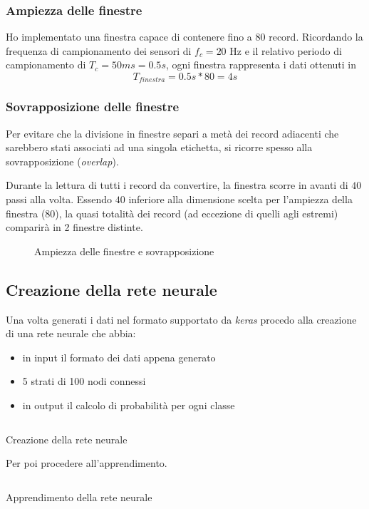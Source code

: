 \subsubsection{Ampiezza delle finestre}
Ho implementato una finestra capace di contenere fino a $80$ record. Ricordando la frequenza di 
campionamento dei sensori di $f_c = 20$ Hz e il relativo periodo di campionamento di $T_c = 50ms = 0.5s$, ogni finestra rappresenta i dati ottenuti in 
$$T_{finestra} = 0.5s * 80 = 4s$$

\subsubsection{Sovrapposizione delle finestre}
Per evitare che la divisione in finestre separi a metà dei record adiacenti che sarebbero stati associati 
ad una singola etichetta, si ricorre spesso alla sovrapposizione (\textit{overlap}).

Durante la lettura di tutti i record da convertire, la finestra scorre in avanti 
di $40$ passi alla volta. Essendo $40$ inferiore alla dimensione scelta per l'ampiezza della finestra ($80$), 
la quasi totalità dei record (ad eccezione di quelli agli estremi) comparirà in 2 finestre distinte.

\vfill
\begin{figure}[H]
    \centering
    
    \caption{Ampiezza delle finestre e sovrapposizione}
    \label{fig:overlay}
\end{figure}


\newpage
\subsection{Creazione della rete neurale}
Una volta generati i dati nel formato supportato da \textit{keras} procedo alla creazione di 
una rete neurale che abbia:
\begin{itemize}
    \item in input il formato dei dati appena generato
    \item 5 strati di 100 nodi connessi
    \item in output il calcolo di probabilità per ogni classe
\end{itemize}
\begin{listing}[H] 
    \inputminted[frame=single,framesep=10pt]{python}{assets/snippets/classifier/dnn_create.py}
    \caption{Creazione della rete neurale}
\end{listing}
Per poi procedere all'apprendimento.
\begin{listing}[H] 
    \inputminted[frame=single,framesep=10pt]{python}{assets/snippets/classifier/dnn_fit.py}
    \caption{Apprendimento della rete neurale}
\end{listing}


